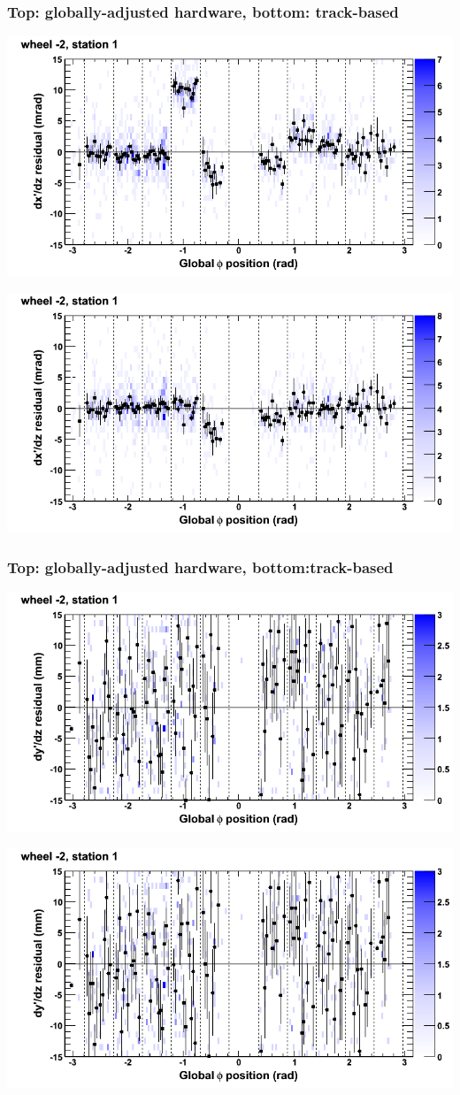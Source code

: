 \documentclass[compress]{beamer}
\begin{document}
\begin{frame}
\frametitle{Top: globally-adjusted hardware, bottom: track-based}
\includegraphics[width=0.7\linewidth]{NOV4_mapplots_HW/DTvsphi_st1whA_dxdz.png}

\includegraphics[width=0.7\linewidth]{NOV4_mapplots/DTvsphi_st1whA_dxdz.png}
\end{frame}

\begin{frame}
\frametitle{Top: globally-adjusted hardware, bottom:track-based}
\includegraphics[width=0.7\linewidth]{NOV4_mapplots_HW/DTvsphi_st1whA_dydz.png}

\includegraphics[width=0.7\linewidth]{NOV4_mapplots/DTvsphi_st1whA_dydz.png}
\end{frame}
\end{document}
